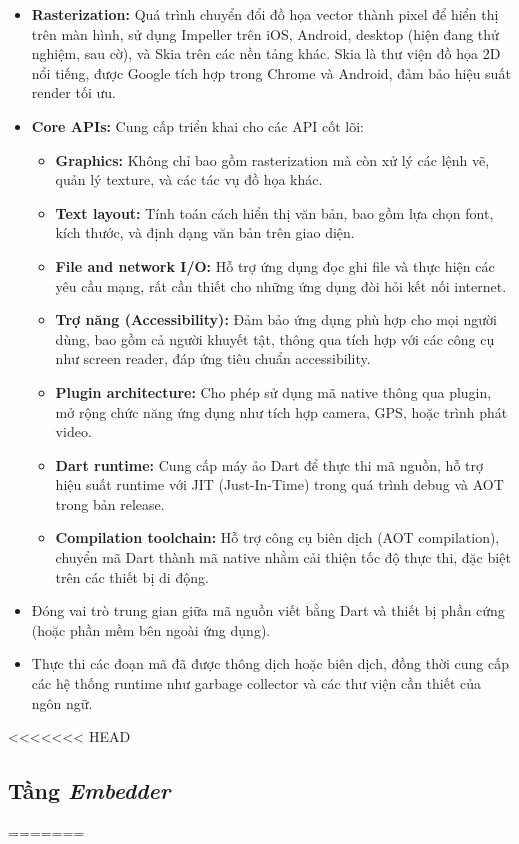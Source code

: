 \documentclass[../DoAn.tex]{subfiles}
\numberwithin{figure}{chapter}
\begin{document}
\begin{itemize}
    \item \textbf{Rasterization:} Quá trình chuyển đổi đồ họa vector thành pixel để hiển thị trên màn hình, sử dụng Impeller trên iOS, Android, desktop (hiện đang thử nghiệm, sau cờ), và Skia trên các nền tảng khác. Skia là thư viện đồ họa 2D nổi tiếng, được Google tích hợp trong Chrome và Android, đảm bảo hiệu suất render tối ưu.
    \item \textbf{Core APIs:} Cung cấp triển khai cho các API cốt lõi:
    \begin{itemize}
        \item \textbf{Graphics:} Không chỉ bao gồm rasterization mà còn xử lý các lệnh vẽ, quản lý texture, và các tác vụ đồ họa khác.
        \item \textbf{Text layout:} Tính toán cách hiển thị văn bản, bao gồm lựa chọn font, kích thước, và định dạng văn bản trên giao diện.
        \item \textbf{File and network I/O:} Hỗ trợ ứng dụng đọc ghi file và thực hiện các yêu cầu mạng, rất cần thiết cho những ứng dụng đòi hỏi kết nối internet.
        \item \textbf{Trợ năng (Accessibility):} Đảm bảo ứng dụng phù hợp cho mọi người dùng, bao gồm cả người khuyết tật, thông qua tích hợp với các công cụ như screen reader, đáp ứng tiêu chuẩn accessibility.
        \item \textbf{Plugin architecture:} Cho phép sử dụng mã native thông qua plugin, mở rộng chức năng ứng dụng như tích hợp camera, GPS, hoặc trình phát video.
        \item \textbf{Dart runtime:} Cung cấp máy ảo Dart để thực thi mã nguồn, hỗ trợ hiệu suất runtime với JIT (Just-In-Time) trong quá trình debug và AOT trong bản release.
        \item \textbf{Compilation toolchain:} Hỗ trợ công cụ biên dịch (AOT compilation), chuyển mã Dart thành mã native nhằm cải thiện tốc độ thực thi, đặc biệt trên các thiết bị di động.
    \end{itemize}
    \item Đóng vai trò trung gian giữa mã nguồn viết bằng Dart và thiết bị phần cứng (hoặc phần mềm bên ngoài ứng dụng).
    \item Thực thi các đoạn mã đã được thông dịch hoặc biên dịch, đồng thời cung cấp các hệ thống runtime như garbage collector và các thư viện cần thiết của ngôn ngữ.
\end{itemize}
<<<<<<< HEAD
\subsection{Tầng \textit{Embedder}}
=======
\end{document}
